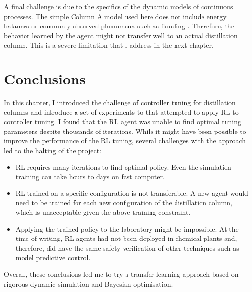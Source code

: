 A final challenge is due to the specifics of the dynamic models of continuous processes. The simple Column A model used here does not include energy balances or commonly observed phenomena such as flooding \cite{Nooraii1998}.  Therefore, the behavior learned by the agent might not transfer well to an actual distillation column. This is a severe limitation that I address in the next chapter.

\section{Conclusions}

In this chapter, I introduced the challenge of controller tuning for distillation columns and introduce a set of experiments to that attempted to apply RL to controller tuning. I found that the RL agent was unable to find optimal tuning parameters despite thousands of iterations. While it might have been  possible to improve the performance of the RL tuning, several challenges with the approach led to the halting of the project:

\begin{itemize}
    \item RL requires many iterations to find optimal policy. Even the simulation training can take hours to days on fast computer.
    \item RL trained on a specific configuration is not transferable. A new agent would need to be trained for each new configuration of the distillation column, which is unacceptable given the above training constraint.
    \item Applying the trained policy to the laboratory might be impossible. At the time of writing, RL agents had not been deployed in chemical plants and, therefore, did have the same safety verification of other techniques such as model predictive control. 
\end{itemize}

 Overall, these conclusions led me to try a transfer learning approach based on rigorous dynamic simulation and Bayesian optimisation.
